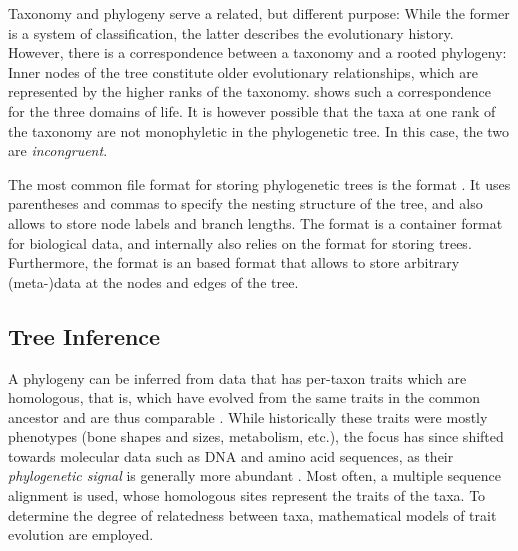 Taxonomy and phylogeny serve a related, but different purpose:
While the former is a system of classification,
the latter describes the evolutionary history.
However, there is a correspondence between a taxonomy and a rooted phylogeny:
Inner nodes of the tree constitute older evolutionary relationships,
which are represented by the higher ranks of the taxonomy.
 shows such a correspondence for the three domains of life.
It is however possible that the taxa at one rank of the taxonomy are not monophyletic in the phylogenetic tree.
In this case, the two are \emph{incongruent}.


The most common file format for storing phylogenetic trees is the  format \cite{Archie1986}.
It uses parentheses and commas to specify the nesting structure of the tree,
and also allows to store node labels and branch lengths.
The  format \cite{Maddison1997} is a container format for biological data,
and internally also relies on the  format for storing trees.
Furthermore, the  format \cite{Han2009} is an  based format
that allows to store arbitrary (meta-)data at the nodes and edges of the tree.


\subsection{Tree Inference}
\label{ch:Foundations:sec:TreeOfLife:sub:TreeInference}

A phylogeny can be inferred from data that has per-taxon traits which are homologous,
that is, which have evolved from the same traits in the common ancestor and are thus comparable \cite{Felsenstein2004,Yang2006}.
While historically these traits were mostly phenotypes (bone shapes and sizes, metabolism, etc.),
the focus has since shifted towards molecular data such as DNA and amino acid sequences,
as their \emph{phylogenetic signal} is generally more abundant \cite{Hillis2000}.
Most often, a multiple sequence alignment is used,
whose homologous sites represent the traits of the taxa.
To determine the degree of relatedness between taxa, mathematical models of trait evolution are employed.

